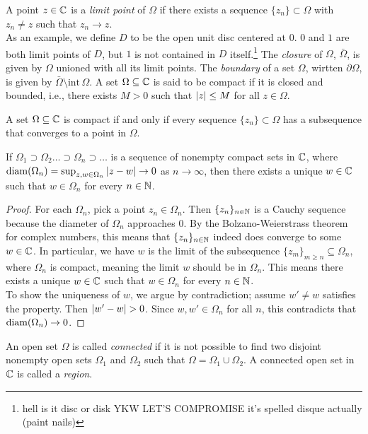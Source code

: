 \noindent A point $z \in \mathbb C$ is a \textit{limit point} of $\Omega$ if there exists a sequence $\{z_n\} \subset \Omega$  with $z_n \neq z$ such that $z_n \to z$.
\\[8pt]
As an example, we define $D$ to be the open unit disc centered at $0$. $0$ and $1$ are both limit points of $D$, but $1$ is not contained in $D$ itself.\footnote{hell is it disc or disk YKW LET'S COMPROMISE it's spelled disque actually (paint nails)} The \textit{closure} of $\Omega$, $\bar{\Omega}$, is given by $\Omega$ unioned with all its limit points. The \textit{boundary} of a set $\Omega$, wirtten $\partial \Omega$, is given by $\bar{\Omega} \setminus \mathrm{int} \, \Omega$. A set $\Omega \subseteq \mathbb C$ is said to be compact if it is closed and bounded, i.e., there exists $M > 0$ such that $\left\lvert z \right\rvert \leq M$ for all $z \in \Omega$.
\begin{theorem}
    A set $\Omega \subseteq \mathbb C$ is compact if and only if every sequence $\{z_n\} \subset \Omega$ has a subsequence that converges to a point in $\Omega$.
\end{theorem}
\begin{proposition}
    If $\Omega_1 \supset \Omega_2 \dots \supset \Omega_n \supset \dots$ is a sequence of nonempty compact sets in $\mathbb C$, where $\operatorname{diam}(\Omega_n) = \sup_{z, w \in \Omega_n} \left\lvert z - w \right\rvert \to 0$ as $n \to \infty$, then there exists a unique $w \in \mathbb C$ such that $w \in \Omega_n$ for every $n \in \mathbb N$.
\end{proposition}
\begin{proof}
    For each $\Omega_n$, pick a point $z_n \in \Omega_n$. Then $\{z_n\}_{n \in \mathbb N}$ is a Cauchy sequence because the diameter of $\Omega_n$ approaches $0$. By the Bolzano-Weierstrass theorem for complex numbers, this means that $\{z_n\}_{n \in \mathbb N}$ indeed does converge to some $w \in \mathbb C$. In particular, we have $w$ is the limit of the subsequence $\{z_m\}_{m \geq n} \subseteq \Omega_n$, where $\Omega_n$ is compact, meaning the limit $w$ should be in $\Omega_n$. This means there exists a unique $w \in \mathbb C$ such that $w \in \Omega_n$ for every $n \in \mathbb N$.
    \\[8pt]
    To show the uniqueness of $w$, we argue by contradiction; assume $w' \neq w$ satisfies the property. Then $\left\lvert w' - w \right\rvert > 0$. Since $w, w' \in \Omega_n$ for all $n$, this contradicts that $\operatorname{diam}(\Omega_n) \to 0$.
\end{proof}
An open set $\Omega$ is called \textit{connected} if it is not possible to find two disjoint nonempty open sets $\Omega_1$ and $\Omega_2$ such that $\Omega = \Omega_1 \cup \Omega_2$. A connected open set in $\mathbb C$ is called a \textit{region}.